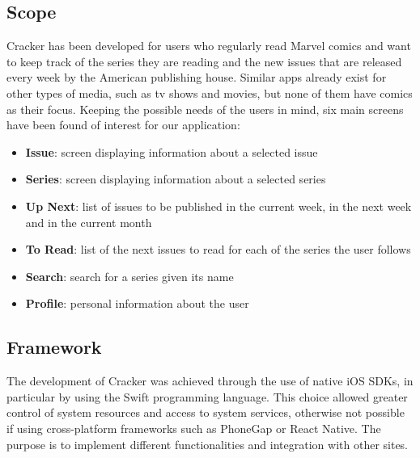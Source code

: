 \subsection{Scope}
Cracker has been developed for users who regularly read Marvel comics and want to keep track of the series they are reading and the new issues that are released every week by the American publishing house. Similar apps already exist for other types of media, such as tv shows and movies, but none of them have comics as their focus. Keeping the possible needs of the users in mind, six main screens have been found of interest for our application:
\begin{itemize}
\item {\textbf{Issue}}: screen displaying information about a selected issue
\item {\textbf{Series}}: screen displaying information about a selected series
\item {\textbf{Up Next}}: list of issues to be published in the current week, in the next week and in the current month
\item {\textbf{To Read}}: list of the next issues to read for each of the series the user follows
\item {\textbf{Search}}: search for a series given its name
\item {\textbf{Profile}}: personal information about the user
\end{itemize}


\subsection{Framework}
The development of Cracker was achieved through the use of native iOS SDKs, in particular by using the Swift programming language. This choice allowed greater control of system resources and access to system services, otherwise not possible if using cross-platform frameworks such as PhoneGap or React Native. The purpose is to implement different functionalities and integration with other sites.


